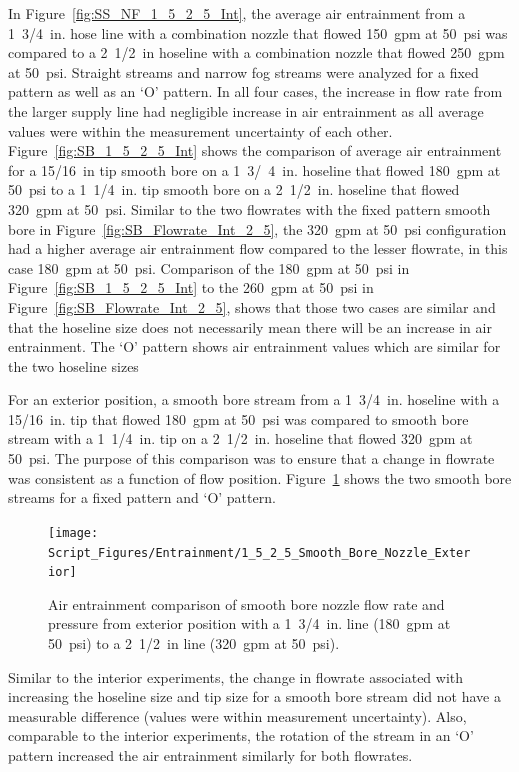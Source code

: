 \documentclass[12pt,oneside]{book}
\begin{document}
In Figure~\ref{fig:SS_NF_1_5_2_5_Int}, the average air entrainment from a 1~3/4~in. hose line with a combination nozzle that flowed 150~gpm at 50~psi was compared to a 2~1/2~in hoseline with a combination nozzle that flowed 250~gpm at 50~psi. Straight streams and narrow fog streams were analyzed for a fixed pattern as well as an `O' pattern. In all four cases, the increase in flow rate from the larger supply line had negligible increase in air entrainment as all average values were within the measurement uncertainty of each other. Figure~\ref{fig:SB_1_5_2_5_Int} shows the comparison of average air entrainment for a 15/16~in tip smooth bore on a 1~3/~4~in. hoseline that flowed 180~gpm at 50~psi to a 1~1/4~in. tip smooth bore on a 2~1/2~in. hoseline that flowed 320~gpm at 50~psi. Similar to the two flowrates with the fixed pattern smooth bore in Figure~\ref{fig:SB_Flowrate_Int_2_5}, the 320~gpm at 50~psi configuration had a higher average air entrainment flow compared to the lesser flowrate, in this case 180~gpm at 50~psi. Comparison of the 180~gpm at 50~psi in Figure~\ref{fig:SB_1_5_2_5_Int} to the 260~gpm at 50~psi in Figure~\ref{fig:SB_Flowrate_Int_2_5}, shows that those two cases are similar and that the hoseline size does not necessarily mean there will be an increase in air entrainment. The `O' pattern shows air entrainment values which are similar for the two hoseline sizes

For an exterior position, a smooth bore stream from a 1~3/4~in. hoseline with a 15/16~in. tip that flowed 180~gpm at 50~psi was compared to smooth bore stream with a 1~1/4~in. tip on a 2~1/2~in. hoseline that flowed 320~gpm at 50~psi. The purpose of this comparison was to ensure that a change in flowrate was consistent as a function of flow position. Figure~\ref{fig:SB_Flowrate_Hoseline_Exterior} shows the two smooth bore streams for a fixed pattern and `O' pattern.

\begin{figure}[!ht]
\centering
\texttt{[image: Script\_Figures/Entrainment/1\_5\_2\_5\_Smooth\_Bore\_Nozzle\_Exterior]}
\caption[Air Entrainment Comparison of Exterior Smooth Bore Nozzle from 1~3/4~in Line to 2~1/2~in. Line]{Air entrainment comparison of smooth bore nozzle flow rate and pressure from exterior position with a 1~3/4~in. line (180~gpm at 50~psi) to a 2~1/2~in line (320~gpm at 50~psi).}
\label{fig:SB_Flowrate_Hoseline_Exterior}
\end{figure}

Similar to the interior experiments, the change in flowrate associated with increasing the hoseline size and tip size for a smooth bore stream did not have a measurable difference (values were within measurement uncertainty). Also, comparable to the interior experiments, the rotation of the stream in an `O' pattern increased the air entrainment similarly for both flowrates.
\end{document}
